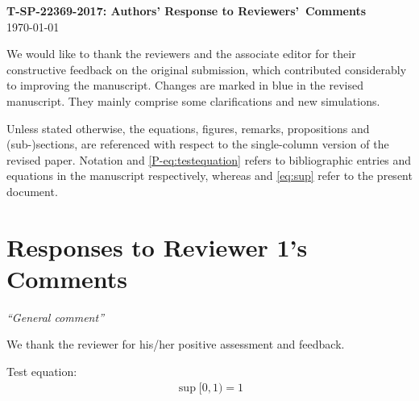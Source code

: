 \documentclass[11pt]{article}
\begin{document}
\begin{center}
    \Large \textbf{T-SP-22369-2017: Authors' Response to Reviewers'~Comments}\\
    \today
\end{center}
We would like to thank the reviewers and the associate editor for
their constructive feedback on the original submission, which
contributed considerably to improving the manuscript. Changes are
marked in {\color{blue}blue} in the revised manuscript. They mainly
comprise some clarifications and new simulations.


\noindent Unless stated otherwise, the equations, figures, remarks,
propositions and (sub-)sections, are referenced with respect to the
single-column version of the revised paper. Notation \cite{P-kay1}
and \eqref{P-eq:testequation} refers to bibliographic entries and equations in
the manuscript respectively, whereas \cite{kay2} and \eqref{eq:sup}
refer to the present document.

\section*{Responses to Reviewer 1's Comments}

 {\it ``General comment''}

\vspace*{0.5em} 
We thank the reviewer for
his/her positive assessment and feedback.

Test equation:
\begin{align}
    \label{eq:sup}
    \sup[0,1) = 1
\end{align}

~\\[.1cm]
\end{document}
